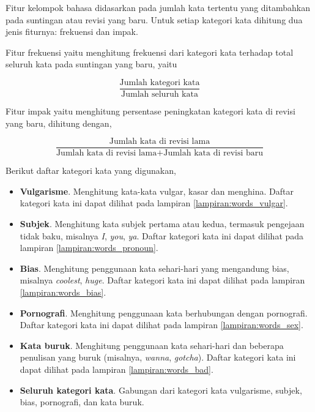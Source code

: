 Fitur kelompok bahasa didasarkan pada jumlah kata tertentu yang ditambahkan
pada suntingan atau revisi yang baru.
Untuk setiap kategori kata dihitung dua jenis fiturnya: frekuensi dan impak.

Fitur frekuensi yaitu menghitung frekuensi dari kategori kata terhadap
total seluruh kata pada suntingan yang baru, yaitu

\begin{equation}
	\frac{\text{Jumlah kategori kata}}
		{\text{Jumlah seluruh kata}}
\end{equation}

Fitur impak yaitu menghitung persentase peningkatan kategori kata di revisi
yang baru, dihitung dengan,

\begin{equation}
	\frac{\text{Jumlah kata di revisi lama}}%
		{
			\text{Jumlah kata di revisi lama} +
			\text{Jumlah kata di revisi baru}
		}
\end{equation}

Berikut daftar kategori kata yang digunakan,

\begin{itemize}
\item \textbf{Vulgarisme}.
Menghitung kata-kata vulgar, kasar dan menghina.
Daftar kategori kata ini dapat dilihat pada lampiran
\ref{lampiran:words_vulgar}.

\item \textbf{Subjek}.
Menghitung kata subjek pertama atau kedua, termasuk pengejaan tidak baku,
misalnya \textit{I}, \textit{you}, \textit{ya}.
Daftar kategori kata ini dapat dilihat pada lampiran
\ref{lampiran:words_pronoun}.

\item \textbf{Bias}.
Menghitung penggunaan kata sehari-hari yang mengandung bias, misalnya
\textit{coolest}, \textit{huge}.
Daftar kategori kata ini dapat dilihat pada lampiran
\ref{lampiran:words_bias}.

\item \textbf{Pornografi}.
Menghitung penggunaan kata berhubungan dengan pornografi.
Daftar kategori kata ini dapat dilihat pada lampiran
\ref{lampiran:words_sex}.

\item \textbf{Kata buruk}.
Menghitung penggunaan kata sehari-hari dan beberapa penulisan yang buruk
(misalnya, \textit{wanna}, \textit{gotcha}).
Daftar kategori kata ini dapat dilihat pada lampiran
\ref{lampiran:words_bad}.

\item \textbf{Seluruh kategori kata}.
Gabungan dari kategori kata vulgarisme, subjek, bias, pornografi, dan kata
buruk.

\end{itemize}

